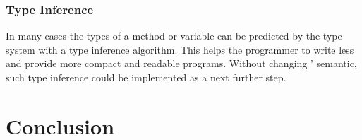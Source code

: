 \subsubsection{Type Inference}
In many cases the types of a method or variable can be predicted 
by the type system with a type inference algorithm. This helps 
the programmer to write less and provide more compact and readable
programs. Without changing \ooplss' semantic, such type inference
could be implemented as a next further step.

\section{Conclusion}
\label{ctr:conclusion}
